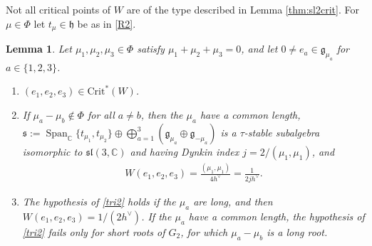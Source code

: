 \documentclass [leqno, 10pt]{amsart}
\newtheorem{lemma}[theorem]{Lemma}%
\theoremstyle{definition}
\numberwithin{equation}{section}
\newcommand{\h}{\mathfrak{h}}
\newcommand{\spn}{\operatorname{Span}}
\newcommand{\sll}{\mathfrak{sl}}
\newcommand{\g}{\mathfrak{g}}
\newcommand{\com}{\mathbb C}
\newcommand{\crtnt}{\mathrm{Crit}^*}
\newcommand{\hv}{h^\vee}
\newcommand{\subs}{\mathfrak{s}}
\begin{document}
Not all critical points of $W$ are of the type described in Lemma \ref{thm:sl2crit}. For $\mu \in \Phi$ let $t_{\mu} \in \h$ be as in \ref{R2}.
\begin{lemma}\label{thm:roottriangle}
Let $\mu_{1}, \mu_{2}, \mu_{3} \in \Phi$ satisfy $\mu_{1} + \mu_{2} + \mu_{3} = 0$, and let $0 \neq e_{a} \in \g_{\mu_{a}}$ for $a \in \{1, 2, 3\}$.
\begin{enumerate}[label=(\arabic*), ref=(\arabic*)]
\item\label{tri1} $(e_{1}, e_{2}, e_{3}) \in \crtnt(W)$.
\item\label{tri2} If $\mu_{a} - \mu_{b} \notin \Phi$ for all $a \neq b$, then the $\mu_{a}$ have a common length, $\subs := \spn_{\com}\{t_{\mu_{1}}, t_{\mu_{2}}\} \oplus \bigoplus_{a=1}^{3}(\g_{\mu_{a}} \oplus \g_{-\mu_{a}})$ is a $\tau$-stable subalgebra isomorphic to $\sll(3, \com)$ and having Dynkin index $j = 2/(\mu_{1}, \mu_{1})$, and
\begin{align}\label{eq:trianglevalue}
W(e_{1}, e_{2}, e_{3}) = \frac{(\mu_{1}, \mu_{1})}{4\hv} = \frac{1}{2j\hv}.
\end{align}
\item\label{tri3} The hypothesis of \ref{tri2} holds if the $\mu_{a}$ are long, and then $W(e_{1}, e_{2}, e_{3}) = 1/(2\hv)$. If the $\mu_{a}$ have a common length, the hypothesis of \ref{tri2} fails only for short roots of $G_{2}$, for which $\mu_{a} - \mu_{b}$ is a long root.
\end{enumerate}
\end{lemma}
\end{document}
